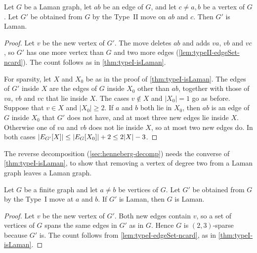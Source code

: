 \begin{theorem}
  \label{thm:typeII-isLaman}
  \leanok
  Let $G$ be a Laman graph, let $ab$ be an edge of $G$, and let
  $c \ne a, b$ be a vertex of $G$. Let $G'$ be obtained from $G$ by the
  Type~II move on $ab$ and $c$. Then $G'$ is Laman.
\end{theorem}
\begin{proof}
  \leanok
  Let $v$ be the new vertex of $G'$. The move deletes $ab$ and adds
  $va$, $vb$ and $vc$, so $G'$ has one more vertex than $G$ and two more
  edges (\cref{lem:typeII-edgeSet-ncard}). The count follows as in
  \cref{thm:typeI-isLaman}.

  For sparsity, let $X$ and $X_0$ be as in the proof of
  \cref{thm:typeI-isLaman}. The edges of $G'$ inside $X$ are the edges
  of $G$ inside $X_0$ other than $ab$, together with those of $va$,
  $vb$ and $vc$ that lie inside $X$. The cases $v \notin X$ and
  $|X_0| = 1$ go as before. Suppose that $v \in X$ and $|X_0| \ge 2$.
  If $a$ and $b$ both lie in $X_0$, then $ab$ is an edge of $G$ inside
  $X_0$ that $G'$ does not have, and at most three new edges lie inside
  $X$. Otherwise one of $va$ and $vb$ does not lie inside $X$, so at
  most two new edges do. In both cases
  $|\edgesIn[G']{X}| \le |\edgesIn{X_0}| + 2 \le 2|X| - 3$.
\end{proof}

The reverse decomposition (\cref{sec:henneberg-decomp}) needs the
converse of \cref{thm:typeI-isLaman}, to show that removing a vertex of
degree two from a Laman graph leaves a Laman graph.

\begin{theorem}
  \label{thm:typeI-reverse-isLaman}
  \leanok
  Let $G$ be a finite graph and let $a \ne b$ be vertices of $G$. Let
  $G'$ be obtained from $G$ by the Type~I move at $a$ and $b$. If $G'$
  is Laman, then $G$ is Laman.
\end{theorem}
\begin{proof}
  \leanok
  Let $v$ be the new vertex of $G'$. Both new edges contain $v$, so a
  set of vertices of $G$ spans the same edges in $G'$ as in $G$. Hence
  $G$ is $(2,3)$-sparse because $G'$ is. The count follows from
  \cref{lem:typeI-edgeSet-ncard}, as in \cref{thm:typeI-isLaman}.
\end{proof}

